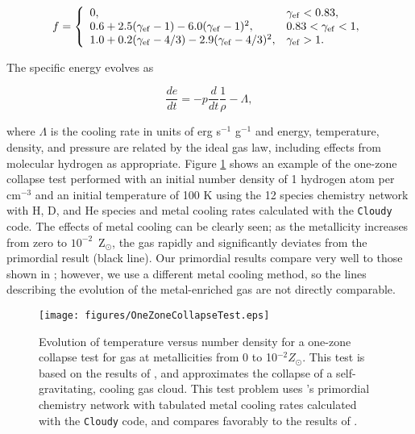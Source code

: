 \begin{equation}
f = \left\{
  \begin{array}{ll}
  0, & \gamma_{\rm ef} < 0.83,\\
  0.6 + 2.5 (\gamma_{\rm ef} - 1) - 6.0 (\gamma_{\rm ef} - 1)^{2}, & 0.83 <
  \gamma_{\rm ef} < 1,\\
  1.0 + 0.2 (\gamma_{\rm ef} - 4/3) - 2.9 (\gamma_{\rm ef} - 4/3)^{2}, & \gamma_{\rm ef} > 1.
\end{array} \right.
\end{equation}

The specific energy evolves as

\begin{equation}
\frac{de}{dt} = -p \frac{d}{dt} \frac{1}{\rho} - \Lambda,
\end{equation}

where $\Lambda$ is the cooling rate in units of erg s$^{-1}$ g$^{-1}$
and energy, temperature, density, and pressure are related by the
ideal gas law, including effects from molecular hydrogen as
appropriate.  Figure \ref{fig.onezone} shows an example of the
one-zone collapse test performed with an initial number density of 1
hydrogen atom per cm$^{-3}$ and an initial temperature of 100 K using
the 12 species chemistry network with H, D, and He species and metal
cooling rates calculated with the \texttt{Cloudy} code.  The effects
of metal cooling can be clearly seen; as the metallicity increases
from zero to $10^{-2}$~Z$_\odot$, the gas rapidly and significantly
deviates from the primordial result (black line).  Our primordial
results compare very well to those shown in
\citet{2005ApJ...626..627O}; however, we use a different metal cooling
method, so the lines describing the evolution of the metal-enriched
gas are not directly comparable.

\begin{figure}
  \begin{center}
    \texttt{[image: figures/OneZoneCollapseTest.eps]}
  \end{center}
  \caption{Evolution of temperature versus number density for a
one-zone collapse test for gas at metallicities from 0 to 10$^{-2}
Z_{\odot}$.  This test is based on the results of
\citet{2005ApJ...626..627O}, and approximates the collapse of a
self-gravitating, cooling gas cloud.  This test problem uses \enzo's
primordial chemistry network with tabulated metal cooling rates
calculated with the \texttt{Cloudy} code, and compares favorably to
the results of \citet{2005ApJ...626..627O}.}
  \label{fig.onezone}
\end{figure}
